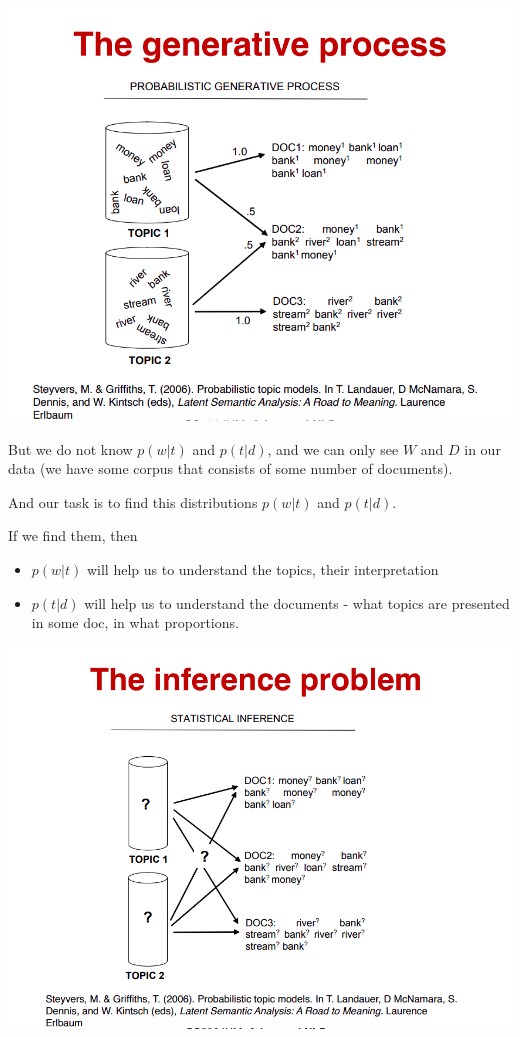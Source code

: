 \documentclass[svgnames]{beamer}
\begin{document}
    \begin{frame}
        \includegraphics[width=\textwidth]{generative-process}
    \end{frame}

    \begin{frame}
        But we do not know $p(w|t)$ and $p(t|d)$, and we can only see $W$ and $D$ in our data
        (we have some corpus that consists of some number of documents).

        And our task is to find this distributions $p(w|t)$ and $p(t|d)$.

        If we find them, then
        \begin{itemize}
            \item $p(w|t)$ will help us to understand the topics, their interpretation
            \item $p(t|d)$ will help us to understand the documents - what topics are presented in some doc, in what proportions.
        \end{itemize}
    \end{frame}

    \begin{frame}
        \includegraphics[width=\textwidth]{inference_prob}
    \end{frame}
\end{document}
